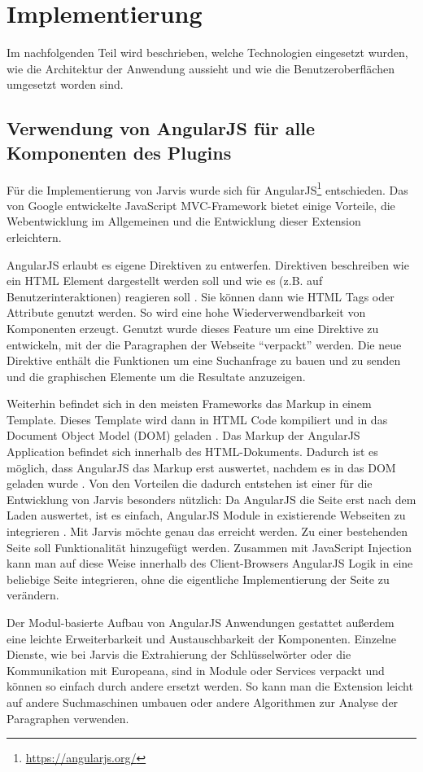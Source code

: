 \section{Implementierung}
Im nachfolgenden Teil wird beschrieben, welche Technologien eingesetzt wurden, wie die Architektur der Anwendung aussieht und wie die Benutzeroberflächen umgesetzt worden sind.
 \subsection{Verwendung von AngularJS für alle Komponenten des Plugins}
 Für die Implementierung von Jarvis wurde sich für AngularJS\footnote{\url{https://angularjs.org/}} entschieden. Das von Google entwickelte JavaScript MVC-Framework bietet einige Vorteile, die Webentwicklung im Allgemeinen und die Entwicklung dieser Extension erleichtern.

 AngularJS erlaubt es eigene Direktiven zu entwerfen. Direktiven beschreiben wie ein HTML Element dargestellt werden soll und wie es (z.B. auf Benutzerinteraktionen) reagieren soll \cite{jain2015angularjs}. Sie können dann wie HTML Tags oder Attribute genutzt werden. So wird eine hohe Wiederverwendbarkeit von Komponenten erzeugt. Genutzt wurde dieses Feature um eine Direktive zu entwickeln, mit der die Paragraphen der Webseite ``verpackt'' werden. Die neue Direktive enthält die Funktionen um eine Suchanfrage zu bauen und zu senden und die graphischen Elemente um die Resultate anzuzeigen. 

 Weiterhin befindet sich in den meisten Frameworks das Markup in einem Template. Dieses Template wird dann in HTML Code kompiliert und in das Document Object Model (DOM) geladen \cite{jain2015angularjs}. Das Markup der AngularJS Application befindet sich innerhalb des HTML-Dokuments. Dadurch ist es möglich, dass AngularJS das Markup erst auswertet, nachdem es in das DOM geladen wurde \cite{jain2015angularjs}. Von den Vorteilen die dadurch entstehen ist einer für die Entwicklung von Jarvis besonders nützlich: Da AngularJS die Seite erst nach dem Laden auswertet, ist es einfach, AngularJS Module in existierende Webseiten zu integrieren \cite{jain2015angularjs}. Mit Jarvis möchte genau das erreicht werden. Zu einer bestehenden Seite soll Funktionalität hinzugefügt werden. Zusammen mit JavaScript Injection kann man auf diese Weise innerhalb des Client-Browsers AngularJS Logik in eine beliebige Seite integrieren, ohne die eigentliche Implementierung der Seite zu verändern.

 Der Modul-basierte Aufbau von AngularJS Anwendungen gestattet außerdem eine leichte Erweiterbarkeit und Austauschbarkeit der Komponenten. Einzelne Dienste, wie bei Jarvis die Extrahierung der Schlüsselwörter oder die Kommunikation mit Europeana, sind in Module oder Services verpackt und können so einfach durch andere ersetzt werden. So kann man die Extension leicht auf andere Suchmaschinen umbauen oder andere Algorithmen zur Analyse der Paragraphen verwenden.

